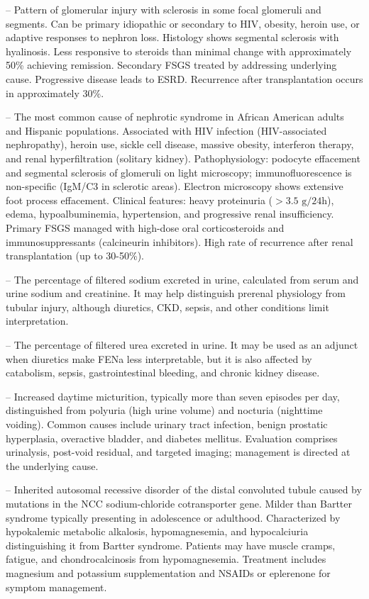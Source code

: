 -- Pattern of glomerular injury with sclerosis in some focal glomeruli and segments. Can be primary idiopathic or secondary to HIV, obesity, heroin use, or adaptive responses to nephron loss. Histology shows segmental sclerosis with hyalinosis. Less responsive to steroids than minimal change with approximately 50\% achieving remission. Secondary FSGS treated by addressing underlying cause. Progressive disease leads to ESRD. Recurrence after transplantation occurs in approximately 30\%.

-- The most common cause of nephrotic syndrome in African American adults and Hispanic populations. Associated with HIV infection (HIV-associated nephropathy), heroin use, sickle cell disease, massive obesity, interferon therapy, and renal hyperfiltration (solitary kidney). Pathophysiology: podocyte effacement and segmental sclerosis of glomeruli on light microscopy; immunofluorescence is non-specific (IgM/C3 in sclerotic areas). Electron microscopy shows extensive foot process effacement. Clinical features: heavy proteinuria ($>3.5\text{ g/24h}$), edema, hypoalbuminemia, hypertension, and progressive renal insufficiency. Primary FSGS managed with high-dose oral corticosteroids and immunosuppressants (calcineurin inhibitors). High rate of recurrence after renal transplantation (up to 30-50\%).

-- The percentage of filtered sodium excreted in urine, calculated from serum and urine sodium and creatinine. It may help distinguish prerenal physiology from tubular injury, although diuretics, CKD, sepsis, and other conditions limit interpretation.

-- The percentage of filtered urea excreted in urine. It may be used as an adjunct when diuretics make FENa less interpretable, but it is also affected by catabolism, sepsis, gastrointestinal bleeding, and chronic kidney disease.

-- Increased daytime micturition, typically more than seven episodes per day, distinguished from polyuria (high urine volume) and nocturia (nighttime voiding). Common causes include urinary tract infection, benign prostatic hyperplasia, overactive bladder, and diabetes mellitus. Evaluation comprises urinalysis, post-void residual, and targeted imaging; management is directed at the underlying cause.

-- Inherited autosomal recessive disorder of the distal convoluted tubule caused by mutations in the NCC sodium-chloride cotransporter gene. Milder than Bartter syndrome typically presenting in adolescence or adulthood. Characterized by hypokalemic metabolic alkalosis, hypomagnesemia, and hypocalciuria distinguishing it from Bartter syndrome. Patients may have muscle cramps, fatigue, and chondrocalcinosis from hypomagnesemia. Treatment includes magnesium and potassium supplementation and NSAIDs or eplerenone for symptom management.

